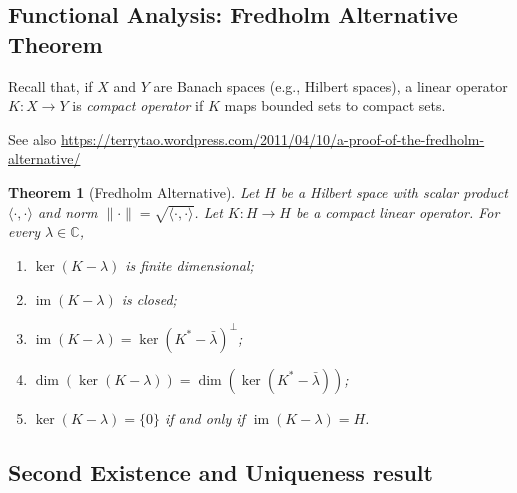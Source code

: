 \documentclass[a4paper,9pt]{amsart}
\newcommand{\C}{\mathbb{C}}	%
\newcommand{\im}{\operatorname{im}}
\theoremstyle{plain}
\newtheorem{theorem}[proposition]{Theorem}
\theoremstyle{definition}
\theoremstyle{remark}
\begin{document}
\subsection{Functional Analysis: Fredholm Alternative Theorem}\label{subs682092ad}

Recall that, if $X$ and $Y$ are Banach spaces (e.g., Hilbert spaces),
a linear operator $K:X\to Y$ is \emph{compact operator}
if $K$ maps bounded sets to compact sets.

See also \url{https://terrytao.wordpress.com/2011/04/10/a-proof-of-the-fredholm-alternative/}
\begin{theorem}[Fredholm Alternative]\label{thm6821bc90}
	Let $H$ be a Hilbert space with scalar product $\langle \cdot,\cdot \rangle$
	and norm $\|\cdot\| = \sqrt{\langle \cdot,\cdot \rangle}$.
	Let $K:H\to H$ be a compact linear operator.
	For every $\lambda\in\C$,
	\begin{enumerate}
	\item	
	$\ker(K-\lambda)$ is finite dimensional;
	\item
	$\im(K-\lambda)$ is closed;
	\item
	$\im(K-\lambda) = \ker(K^*-\bar \lambda)^\perp$;
	\item
	$\dim(\ker(K-\lambda)) = \dim(\ker(K^*-\bar \lambda))$;
	\item
	$\ker(K-\lambda)=\{0\}$ if and only if $\im(K-\lambda) = H$.
	\end{enumerate}
\end{theorem}

\subsection{Second Existence and Uniqueness result}\label{subs6821b4db}
\end{document}
